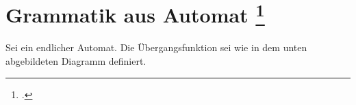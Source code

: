 \documentclass{lehramt-informatik-aufgabe}
\begin{document}
\section{Grammatik aus Automat
\footcite[Seite 4, Aufgabe 3]{theo:ab:1}}

Sei 
ein endlicher Automat. Die Übergangsfunktion sei wie in dem unten
abgebildeten Diagramm definiert.
\end{document}
